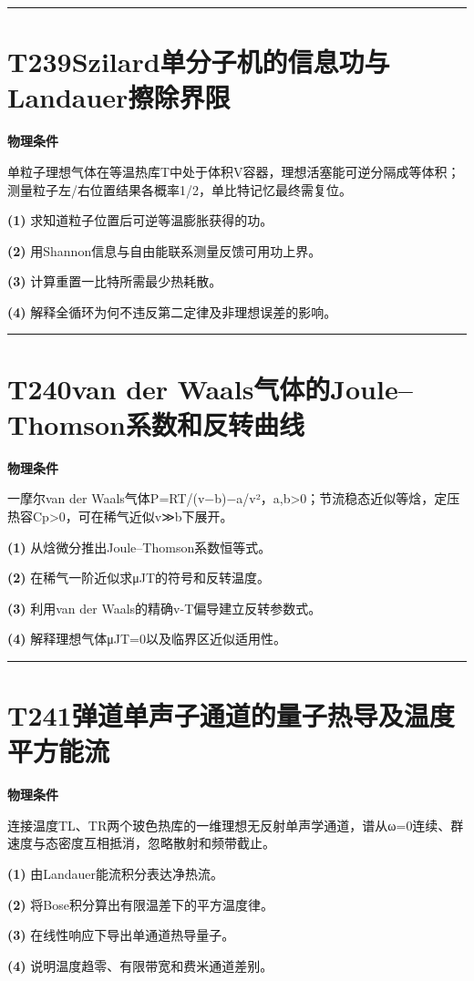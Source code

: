 \documentclass[UTF8,a4paper,11pt,oneside,openany]{ctexbook}
\begin{document}
\par\bigskip\hrule\bigskip
\section*{T239\quad Szilard单分子机的信息功与Landauer擦除界限}
\textbf{物理条件}\par 单粒子理想气体在等温热库T中处于体积V容器，理想活塞能可逆分隔成等体积；测量粒子左/右位置结果各概率1/2，单比特记忆最终需复位。
\par\noindent\textbf{(1)} 求知道粒子位置后可逆等温膨胀获得的功。
\par\noindent\textbf{(2)} 用Shannon信息与自由能联系测量反馈可用功上界。
\par\noindent\textbf{(3)} 计算重置一比特所需最少热耗散。
\par\noindent\textbf{(4)} 解释全循环为何不违反第二定律及非理想误差的影响。

\par\bigskip\hrule\bigskip
\section*{T240\quad van der Waals气体的Joule–Thomson系数和反转曲线}
\textbf{物理条件}\par 一摩尔van der Waals气体P=RT/(v−b)−a/v²，a,b>0；节流稳态近似等焓，定压热容Cp>0，可在稀气近似v≫b下展开。
\par\noindent\textbf{(1)} 从焓微分推出Joule–Thomson系数恒等式。
\par\noindent\textbf{(2)} 在稀气一阶近似求μJT的符号和反转温度。
\par\noindent\textbf{(3)} 利用van der Waals的精确v-T偏导建立反转参数式。
\par\noindent\textbf{(4)} 解释理想气体μJT=0以及临界区近似适用性。

\par\bigskip\hrule\bigskip
\section*{T241\quad 弹道单声子通道的量子热导及温度平方能流}
\textbf{物理条件}\par 连接温度TL、TR两个玻色热库的一维理想无反射单声学通道，谱从ω=0连续、群速度与态密度互相抵消，忽略散射和频带截止。
\par\noindent\textbf{(1)} 由Landauer能流积分表达净热流。
\par\noindent\textbf{(2)} 将Bose积分算出有限温差下的平方温度律。
\par\noindent\textbf{(3)} 在线性响应下导出单通道热导量子。
\par\noindent\textbf{(4)} 说明温度趋零、有限带宽和费米通道差别。
\end{document}
